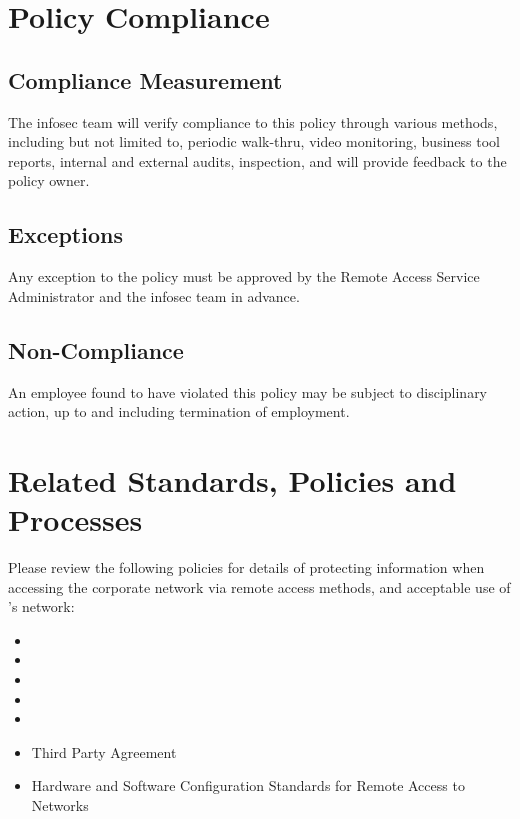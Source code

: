 \section{Policy Compliance}
\subsection{Compliance Measurement}
The \gls{infosec} team will verify compliance to this policy through various methods, including but not limited to, periodic walk-thru, video monitoring, business tool reports, internal and external audits, inspection, and will provide feedback to the policy owner.
\subsection{Exceptions}
Any exception to the policy must be approved by the Remote Access Service Administrator and the \gls{infosec} team in advance.
\subsection{Non-Compliance}
An employee found to have violated this policy may be subject to disciplinary action, up to and including termination of employment. 
\section{Related Standards, Policies\oxford{} and Processes}
Please review the following policies for details of protecting information when accessing the corporate network via remote access methods, and acceptable use of \CompanyName{}'s network:
\begin{itemize}
\item {}
\item {}
\item {}
\item {}
\item {}
\item Third Party Agreement
\item Hardware and Software Configuration Standards for Remote Access to \CompanyName{} Networks
\end{itemize}

